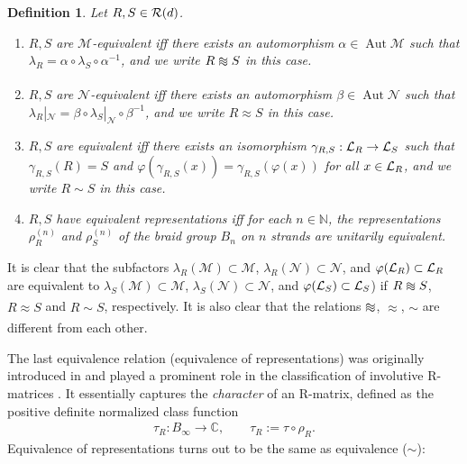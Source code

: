 \documentclass[12pt,a4paper]{amsart}
\numberwithin{equation}{section}
\newtheorem{definition}[theorem]{Definition}
\theoremstyle{remark}
\def\Aut{\operatorname{Aut}}
\newcommand{\Cl}{\mathbb{C}}
\newcommand{\Nl}{\mathbb{N}}
\newcommand{\la}{\lambda}
\newcommand{\CM}[0]{\mathcal{M}} \newcommand{\CN}[0]{\mathcal{N}}
\def\apeqA{\SavedStyle\sim}
\def\Msim{\setstackgap{L}{\dimexpr.5pt+1.5\LMpt}\ensurestackMath{%
  \ThisStyle{\mathrel{\Centerstack{{\apeqA} {\apeqA} {\apeqA}}}}}}
\def\Nsim{\approx}
\begin{document}
\begin{definition}\label{def:equivalence}
	Let $R,S\in\mathcal{R}(d)$. 
	\begin{enumerate}
		\item $R,S$ are {\em $\CM$-equivalent} iff there exists an automorphism $\alpha\in\Aut\CM$ such that $\la_R=\alpha\circ\la_S\circ\alpha^{-1}$, and we write $R\Msim S$ in this case.
		\item $R,S$ are {\em $\CN$-equivalent} iff there exists an automorphism $\beta\in\Aut\CN$ such that ${\la_R}|_{\CN}=\beta\circ{\la_S}|_{\CN}\circ\beta^{-1}$, and we write $R\Nsim S$ in this case.
		\item $R,S$ are {\em equivalent} iff there exists an isomorphism $\gamma_{R,S}:\mathcal{L}_R\to\mathcal{L}_S$ such that $\gamma_{R,S}(R)=S$ and $\varphi(\gamma_{R,S}(x))=\gamma_{R,S}(\varphi(x))$ for all $x\in\mathcal{L}_R$, and we write $R\sim S$ in this case.
		\item $R,S$ have {\em equivalent representations} iff for each $n\in\Nl$, the representations $\rho_R^{(n)}$ and $\rho_S^{(n)}$ of the braid group $B_n$ on $n$ strands are unitarily equivalent. 
	\end{enumerate}
\end{definition}

It is clear that the subfactors $\la_R(\CM)\subset\CM$, $\la_R(\CN)\subset\CN$, and $\varphi(\mathcal{L}_R)\subset\mathcal{L}_R$ are equivalent to $\la_S(\CM)\subset\CM$, $\la_S(\CN)\subset\CN$, and $\varphi(\mathcal{L}_S)\subset\mathcal{L}_S$) if $R\Msim S$, $R\Nsim S$ and $R\sim S$, respectively. It is also clear that the relations $\Msim$, $\Nsim$, $\sim$ are different from each other.

The last equivalence relation (equivalence of representations) was originally introduced in \cite{AlazzawiLechner:2016} and played a prominent role in the classification of involutive R-matrices \cite{LechnerPennigWood:2019}. It essentially captures the {\em character} of an R-matrix, defined as the positive definite normalized class function
\begin{align}
 \tau_R:B_\infty\to\Cl,\qquad \tau_R:=\tau\circ\rho_R.
\end{align}
Equivalence of representations turns out to be the same as equivalence ($\sim$):
\end{document}
